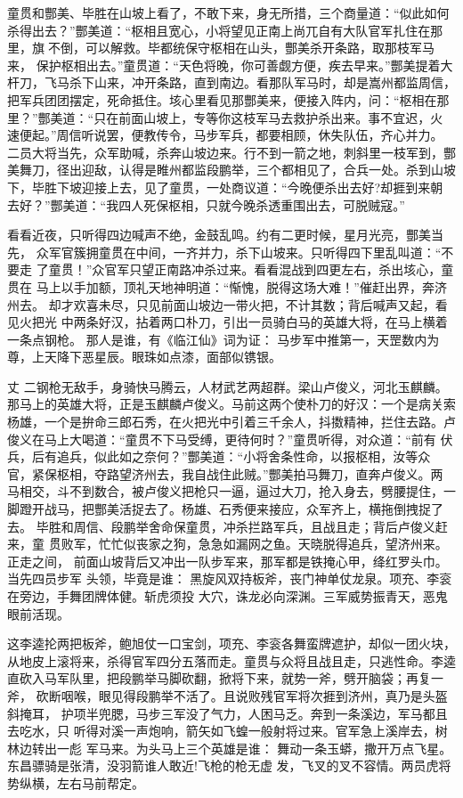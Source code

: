 童贯和酆美、毕胜在山坡上看了，不敢下来，身无所措，三个商量道：“似此如何
杀得出去？”酆美道：“枢相且宽心，小将望见正南上尚兀自有大队官军扎住在那
里，旗不倒，可以解救。毕都统保守枢相在山头，酆美杀开条路，取那枝军马来，
保护枢相出去。”童贯道：“天色将晚，你可善觑方便，疾去早来。”酆美提着大
杆刀，飞马杀下山来，冲开条路，直到南边。看那队军马时，却是嵩州都监周信，
把军兵团团摆定，死命抵住。垓心里看见那酆美来，便接入阵内，问：“枢相在那
里？”酆美道：“只在前面山坡上，专等你这枝军马去救护杀出来。事不宜迟，火
速便起。”周信听说罢，便教传令，马步军兵，都要相顾，休失队伍，齐心并力。
二员大将当先，众军助喊，杀奔山坡边来。行不到一箭之地，刺斜里一枝军到，酆
美舞刀，径出迎敌，认得是睢州都监段鹏举，三个都相见了，合兵一处。杀到山坡
下，毕胜下坡迎接上去，见了童贯，一处商议道：“今晚便杀出去好?却捱到来朝
去好？”酆美道：“我四人死保枢相，只就今晚杀透重围出去，可脱贼寇。”

看看近夜，只听得四边喊声不绝，金鼓乱鸣。约有二更时候，星月光亮，酆美当先，
众军官簇拥童贯在中间，一齐并力，杀下山坡来。只听得四下里乱叫道：“不要走
了童贯！”众官军只望正南路冲杀过来。看看混战到四更左右，杀出垓心，童贯在
马上以手加额，顶礼天地神明道：“惭愧，脱得这场大难！”催赶出界，奔济州去。
却才欢喜未尽，只见前面山坡边一带火把，不计其数；背后喊声又起，看见火把光
中两条好汉，拈着两口朴刀，引出一员骑白马的英雄大将，在马上横着一条点钢枪。
那人是谁，有《临江仙》词为证：
马步军中推第一，天罡数内为尊，上天降下恶星辰。眼珠如点漆，面部似镌银。

丈
二钢枪无敌手，身骑快马腾云，人材武艺两超群。梁山卢俊义，河北玉麒麟。
那马上的英雄大将，正是玉麒麟卢俊义。马前这两个使朴刀的好汉：一个是病关索
杨雄，一个是拚命三郎石秀，在火把光中引着三千余人，抖擞精神，拦住去路。卢
俊义在马上大喝道：“童贯不下马受缚，更待何时？”童贯听得，对众道：“前有
伏兵，后有追兵，似此如之奈何？”酆美道：“小将舍条性命，以报枢相，汝等众
官，紧保枢相，夺路望济州去，我自战住此贼。”酆美拍马舞刀，直奔卢俊义。两
马相交，斗不到数合，被卢俊义把枪只一逼，逼过大刀，抢入身去，劈腰提住，一
脚蹬开战马，把酆美活捉去了。杨雄、石秀便来接应，众军齐上，横拖倒拽捉了去。
毕胜和周信、段鹏举舍命保童贯，冲杀拦路军兵，且战且走；背后卢俊义赶来，童
贯败军，忙忙似丧家之狗，急急如漏网之鱼。天晓脱得追兵，望济州来。正走之间，
前面山坡背后又冲出一队步军来，那军都是铁掩心甲，绛红罗头巾。当先四员步军
头领，毕竟是谁：
黑旋风双持板斧，丧门神单仗龙泉。项充、李衮在旁边，手舞团牌体健。斩虎须投
大穴，诛龙必向深渊。三军威势振青天，恶鬼眼前活现。

这李逵抡两把板斧，鲍旭仗一口宝剑，项充、李衮各舞蛮牌遮护，却似一团火块，
从地皮上滚将来，杀得官军四分五落而走。童贯与众将且战且走，只逃性命。李逵
直砍入马军队里，把段鹏举马脚砍翻，掀将下来，就势一斧，劈开脑袋；再复一斧，
砍断咽喉，眼见得段鹏举不活了。且说败残官军将次捱到济州，真乃是头盔斜掩耳，
护项半兜腮，马步三军没了气力，人困马乏。奔到一条溪边，军马都且去吃水，只
听得对溪一声炮响，箭矢如飞蝗一般射将过来。官军急上溪岸去，树林边转出一彪
军马来。为头马上三个英雄是谁：
舞动一条玉蟒，撒开万点飞星。东昌骠骑是张清，没羽箭谁人敢近!飞枪的枪无虚
发，飞叉的叉不容情。两员虎将势纵横，左右马前帮定。

